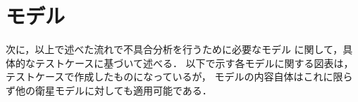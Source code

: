 \documentclass[11pt]{jsreport}
\begin{document}


\newpage
\section{モデル}
次に，以上で述べた流れで不具合分析を行うために必要なモデル
に関して，具体的なテストケースに基づいて述べる．%
以下で示す各モデルに関する図表は，テストケースで作成したものになっているが，
モデルの内容自体はこれに限らず他の衛星モデルに対しても適用可能である．

\end{document}

